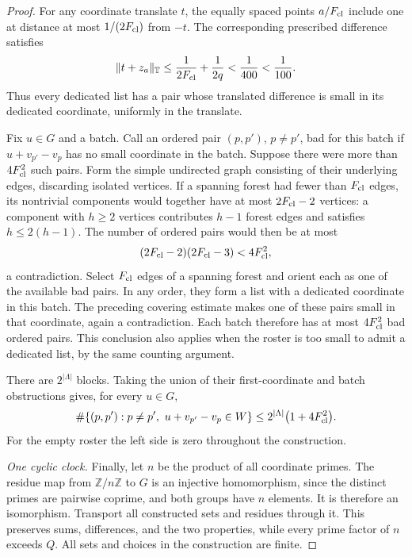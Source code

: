 \begin{proof}
For any coordinate translate $t$, the equally spaced points
$a/F_{\rm cl}$ include one at distance at most $1/(2F_{\rm cl})$ from
$-t$.  The corresponding prescribed difference satisfies
\[
 \|t+z_a\|_{\mathbb T}
 \leq\frac1{2F_{\rm cl}}+\frac1{2q}
 <\frac1{400}<\frac1{100}.
\]
Thus every dedicated list has a pair whose translated difference is small
in its dedicated coordinate, uniformly in the translate.

Fix $u\in G$ and a batch.  Call an ordered pair $(p,p')$, $p\ne p'$,
bad for this batch if $u+v_{p'}-v_p$ has no small coordinate in the batch.
Suppose there were more than $4F_{\rm cl}^{2}$ such pairs.  Form the
simple undirected graph consisting of their underlying edges, discarding
isolated vertices.  If a spanning forest had fewer than $F_{\rm cl}$
edges, its nontrivial components would together have at most
$2F_{\rm cl}-2$ vertices: a component with $h\geq2$ vertices contributes
$h-1$ forest edges and satisfies $h\leq2(h-1)$.  The number of ordered
pairs would then be at most
\[
 (2F_{\rm cl}-2)(2F_{\rm cl}-3)<4F_{\rm cl}^{2},
\]
a contradiction.  Select $F_{\rm cl}$ edges of a spanning forest and
orient each as one of the available bad pairs.  In any order, they form a
list with a dedicated coordinate in this batch.  The preceding covering
estimate makes one of these pairs small in that coordinate, again a
contradiction.  Each batch therefore has at most $4F_{\rm cl}^{2}$ bad
ordered pairs.  This conclusion also applies when the roster is too small
to admit a dedicated list, by the same counting argument.

There are $2^{|\Lambda|}$ blocks.  Taking the union of their
first-coordinate and batch obstructions gives, for every $u\in G$,
\[
 \#\{(p,p'):p\ne p',\ u+v_{p'}-v_p\in W\}
 \leq 2^{|\Lambda|}\bigl(1+4F_{\rm cl}^{2}\bigr).
\]
For the empty roster the left side is zero throughout the construction.

\emph{One cyclic clock.}
Finally, let $n$ be the product of all coordinate primes.  The residue map
from $\mathbb Z/n\mathbb Z$ to $G$ is an injective homomorphism, since the
distinct primes are pairwise coprime, and both groups have $n$ elements.
It is therefore an isomorphism.  Transport all constructed sets and
residues through it.  This preserves sums, differences, and the two
properties, while every prime factor of $n$ exceeds $Q$.  All sets and
choices in the construction are finite.
\end{proof}
